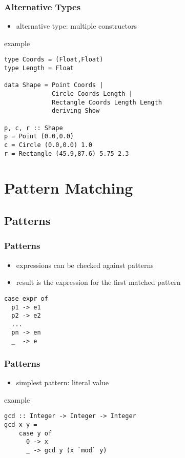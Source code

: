 \documentclass[dvipsnames]{beamer}
\theoremstyle{plain}
\begin{document}
\begin{frame}[fragile]
  \frametitle{Alternative Types}

  \begin{itemize}
    \item alternative type: multiple constructors
  \end{itemize}

  \begin{exampleblock}{example}
    \begin{lstlisting}
type Coords = (Float,Float)
type Length = Float

data Shape = Point Coords |
             Circle Coords Length |
             Rectangle Coords Length Length
             deriving Show

p, c, r :: Shape
p = Point (0.0,0.0)
c = Circle (0.0,0.0) 1.0
r = Rectangle (45.9,87.6) 5.75 2.3
    \end{lstlisting}
  \end{exampleblock}
\end{frame}

\section{Pattern Matching}

\subsection{Patterns}

\begin{frame}[fragile]
  \frametitle{Patterns}

  \begin{itemize}
    \item expressions can be checked against patterns
    \item result is the expression for the first matched pattern
  \end{itemize}

  \begin{lstlisting}
case expr of
  p1 -> e1
  p2 -> e2
  ...
  pn -> en
  _  -> e
  \end{lstlisting}
\end{frame}

\begin{frame}[fragile]
  \frametitle{Patterns}

  \begin{itemize}
    \item simplest pattern: literal value
  \end{itemize}

  \begin{exampleblock}{example}
    \begin{lstlisting}
gcd :: Integer -> Integer -> Integer
gcd x y =
    case y of
      0 -> x
      _ -> gcd y (x `mod` y)
    \end{lstlisting}
  \end{exampleblock}
\end{frame}
\end{document}

